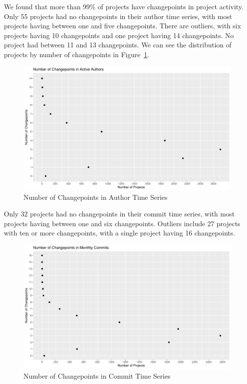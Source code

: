 \documentclass[10pt,conference]{IEEEtran}
\begin{document}
We found that more than 99\% of projects have changepoints in project activity. Only 55 projects had no changepoints in their author time series, with most projects having between one and five changepoints. There are outliers, with six projects having 10 changepoints and one project having 14 changepoints. No project had between 11 and 13 changepoints. We can see the distribution of projects by number of changepoints in Figure~\ref{fig:authorcpts}.
\begin{figure}[ht!]
    \centering
    \includegraphics[width=\linewidth]{author-changepoints.pdf}
    \caption{Number of Changepoints in Author Time Series}
    \label{fig:authorcpts}
\end{figure}

Only 32 projects had no changepoints in their commit time series, with most projects having between one and six changepoints. Outliers include 27 projects with ten or more changepoints, with a single project having 16 changepoints.
\begin{figure}[ht!]
    \centering
    \includegraphics[width=\linewidth]{commit-changepoints.pdf}
    \caption{Number of Changepoints in Commit Time Series}
    \label{fig:commitcpts}
\end{figure}
\end{document}
